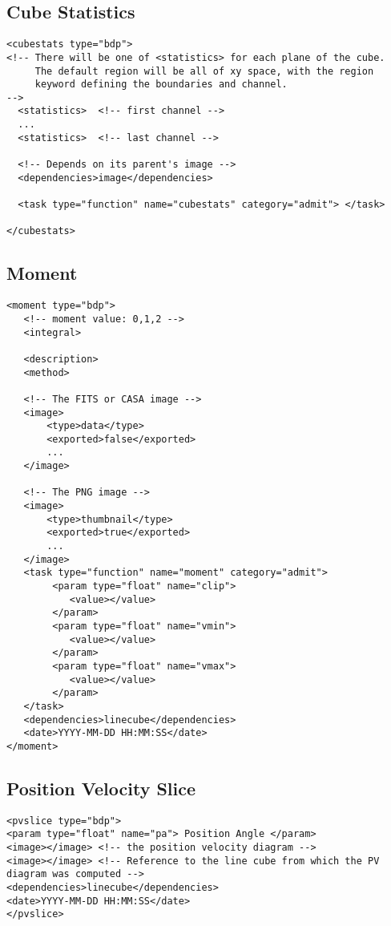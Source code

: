 \documentclass{article}
\begin{document}
\subsection{Cube Statistics}
\footnotesize
\begin{verbatim}
<cubestats type="bdp">
<!-- There will be one of <statistics> for each plane of the cube. 
     The default region will be all of xy space, with the region 
     keyword defining the boundaries and channel. 
-->
  <statistics>  <!-- first channel -->
  ...
  <statistics>  <!-- last channel -->

  <!-- Depends on its parent's image -->
  <dependencies>image</dependencies>

  <task type="function" name="cubestats" category="admit"> </task>

</cubestats>
\end{verbatim}
\normalsize

\subsection{Moment}
\footnotesize
\begin{verbatim}
<moment type="bdp">
   <!-- moment value: 0,1,2 -->
   <integral>          

   <description>
   <method>

   <!-- The FITS or CASA image -->
   <image> 
       <type>data</type>
       <exported>false</exported>
       ...
   </image>  

   <!-- The PNG image -->
   <image> 
       <type>thumbnail</type>
       <exported>true</exported>
       ...
   </image>  
   <task type="function" name="moment" category="admit">
        <param type="float" name="clip">
           <value></value>
        </param>
        <param type="float" name="vmin">
           <value></value>
        </param>
        <param type="float" name="vmax">
           <value></value>
        </param>
   </task>
   <dependencies>linecube</dependencies>
   <date>YYYY-MM-DD HH:MM:SS</date>
</moment>
\end{verbatim}
\normalsize

\subsection{Position Velocity Slice}
\footnotesize
\begin{verbatim}
<pvslice type="bdp">
<param type="float" name="pa"> Position Angle </param>
<image></image> <!-- the position velocity diagram -->
<image></image> <!-- Reference to the line cube from which the PV diagram was computed -->
<dependencies>linecube</dependencies>
<date>YYYY-MM-DD HH:MM:SS</date>
</pvslice>
\end{verbatim}
\normalsize
\end{document}
